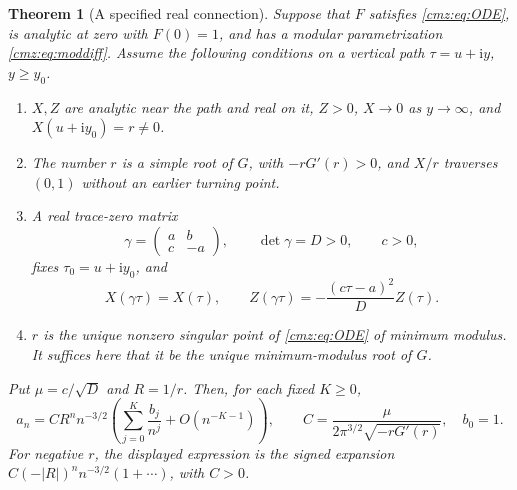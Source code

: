 \documentclass[11pt,letterpaper]{article}
\numberwithin{equation}{section}
\newtheorem{theorem}{Theorem}[section]
\theoremstyle{definition}\newtheorem{definition}[theorem]{Definition}
\theoremstyle{remark}\newtheorem{remark}[theorem]{Remark}
\newcommand{\ii}{\mathrm i}
\begin{document}
\begin{theorem}[A specified real connection]
\label{cmz:thm:connection}
Suppose that $F$ satisfies \eqref{cmz:eq:ODE}, is analytic at zero with $F(0)=1$, and has a modular parametrization \eqref{cmz:eq:moddiff}. Assume the following conditions on a vertical path $\tau=u+\ii y$, $y\geq y_0$.
\begin{enumerate}[label=(\roman*)]
\item $X,Z$ are analytic near the path and real on it, $Z>0$, $X\to0$ as $y\to\infty$, and $X(u+\ii y_0)=r\ne0$.
\item The number $r$ is a simple root of $G$, with $-rG'(r)>0$, and $X/r$ traverses $(0,1)$ without an earlier turning point.
\item A real trace-zero matrix
\[
\gamma=\begin{pmatrix}a&b\\c&-a\end{pmatrix},\qquad
\det\gamma=D>0,\qquad c>0,
\]
fixes $\tau_0=u+\ii y_0$, and
\begin{equation}
X(\gamma\tau)=X(\tau),\qquad
Z(\gamma\tau)=-\frac{(c\tau-a)^2}{D}Z(\tau).
\label{cmz:eq:weight}
\end{equation}
\item $r$ is the unique nonzero singular point of \eqref{cmz:eq:ODE} of minimum modulus. It suffices here that it be the unique minimum-modulus root of $G$.
\end{enumerate}
Put $\mu=c/\sqrt D$ and $R=1/r$. Then, for each fixed $K\geq0$,
\begin{equation}
a_n=C R^n n^{-3/2}
\left(\sum_{j=0}^K\frac{b_j}{n^j}+O(n^{-K-1})\right),\qquad
C=\frac{\mu}{2\pi^{3/2}\sqrt{-rG'(r)}},\quad b_0=1.
\label{cmz:eq:connectionC}
\end{equation}
For negative $r$, the displayed expression is the signed expansion $C(-|R|)^n n^{-3/2}(1+\cdots)$, with $C>0$.
\end{theorem}
\end{document}
